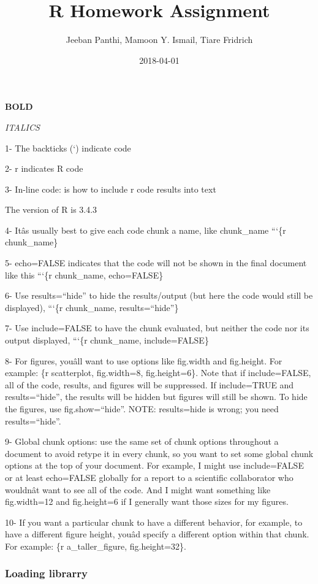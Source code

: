 \documentclass[]{article}
\title{R Homework Assignment}
\author{Jeeban Panthi, Mamoon Y. Ismail, Tiare Fridrich}
\date{2018-04-01}
\begin{document}
\maketitle

\textbf{BOLD}

\emph{ITALICS}

1- The backticks (`) indicate code

2- r indicates R code

3- In-line code: is how to include r code results into text

The version of R is 3.4.3

4- Itâs usually best to give each code chunk a name, like chunk\_name
```\{r chunk\_name\}

5- echo=FALSE indicates that the code will not be shown in the final
document like this ```\{r chunk\_name, echo=FALSE\}

6- Use results=``hide'' to hide the results/output (but here the code
would still be displayed), ```\{r chunk\_name, results=``hide''\}

7- Use include=FALSE to have the chunk evaluated, but neither the code
nor its output displayed, ```\{r chunk\_name, include=FALSE\}

8- For figures, youâll want to use options like fig.width and
fig.height. For example: \{r scatterplot, fig.width=8, fig.height=6\}.
Note that if include=FALSE, all of the code, results, and figures will
be suppressed. If include=TRUE and results=``hide'', the results will be
hidden but figures will still be shown. To hide the figures, use
fig.show=``hide''. NOTE: results=hide is wrong; you need
results=``hide''.

9- Global chunk options: use the same set of chunk options throughout a
document to avoid retype it in every chunk, so you want to set some
global chunk options at the top of your document. For example, I might
use include=FALSE or at least echo=FALSE globally for a report to a
scientific collaborator who wouldnât want to see all of the code. And
I might want something like fig.width=12 and fig.height=6 if I generally
want those sizes for my figures.

10- If you want a particular chunk to have a different behavior, for
example, to have a different figure height, youâd specify a different
option within that chunk. For example: \{r a\_taller\_figure,
fig.height=32\}.

\subsubsection{Loading librarry}\label{loading-librarry}
\end{document}
